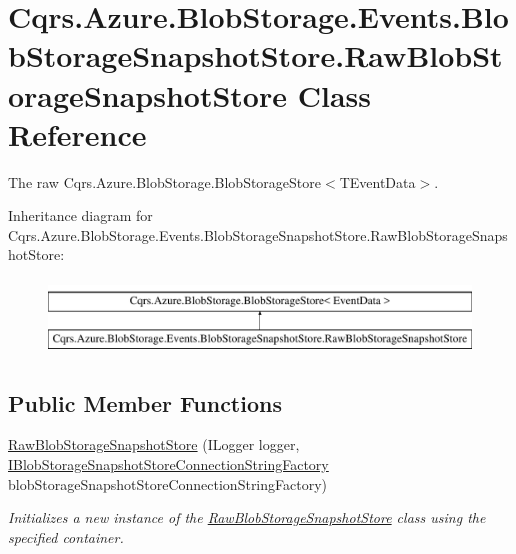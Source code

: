 \hypertarget{classCqrs_1_1Azure_1_1BlobStorage_1_1Events_1_1BlobStorageSnapshotStore_1_1RawBlobStorageSnapshotStore}{}\section{Cqrs.\+Azure.\+Blob\+Storage.\+Events.\+Blob\+Storage\+Snapshot\+Store.\+Raw\+Blob\+Storage\+Snapshot\+Store Class Reference}
\label{classCqrs_1_1Azure_1_1BlobStorage_1_1Events_1_1BlobStorageSnapshotStore_1_1RawBlobStorageSnapshotStore}


The raw Cqrs.\+Azure.\+Blob\+Storage.\+Blob\+Storage\+Store$<$\+T\+Event\+Data$>$.  


Inheritance diagram for Cqrs.\+Azure.\+Blob\+Storage.\+Events.\+Blob\+Storage\+Snapshot\+Store.\+Raw\+Blob\+Storage\+Snapshot\+Store\+:\begin{figure}[H]
\begin{center}
\leavevmode
\includegraphics[height=2.000000cm]{classCqrs_1_1Azure_1_1BlobStorage_1_1Events_1_1BlobStorageSnapshotStore_1_1RawBlobStorageSnapshotStore}
\end{center}
\end{figure}
\subsection*{Public Member Functions}
\begin{DoxyCompactItemize}
\item 
\hyperlink{classCqrs_1_1Azure_1_1BlobStorage_1_1Events_1_1BlobStorageSnapshotStore_1_1RawBlobStorageSnapshotStore_a77ba6a483bad41429e0331a75bc68856_a77ba6a483bad41429e0331a75bc68856}{Raw\+Blob\+Storage\+Snapshot\+Store} (I\+Logger logger, \hyperlink{interfaceCqrs_1_1Azure_1_1BlobStorage_1_1IBlobStorageSnapshotStoreConnectionStringFactory}{I\+Blob\+Storage\+Snapshot\+Store\+Connection\+String\+Factory} blob\+Storage\+Snapshot\+Store\+Connection\+String\+Factory)
\begin{DoxyCompactList}\small\item\em Initializes a new instance of the \hyperlink{classCqrs_1_1Azure_1_1BlobStorage_1_1Events_1_1BlobStorageSnapshotStore_1_1RawBlobStorageSnapshotStore}{Raw\+Blob\+Storage\+Snapshot\+Store} class using the specified container. \end{DoxyCompactList}\end{DoxyCompactItemize}
